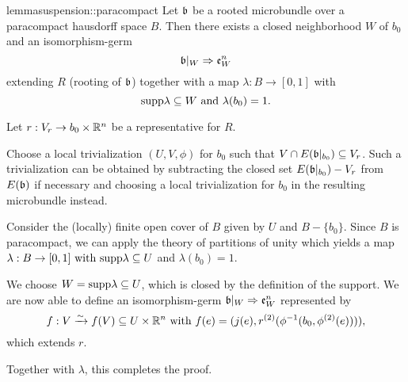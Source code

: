 \begin{mystatement}{lemma}{suspension::paracompact}
    Let $\bb$ be a rooted microbundle over a paracompact hausdorff space $B$.
    Then there exists a closed neighborhood $W$ of $b_0$ and an isomorphism-germ
    \[ \germ{\bb[W]}{\be{W}} \]
    extending $R$ (rooting of $\bb$) together with a map $\lambda: B \to [0, 1]$ with
    \[ \text{supp}{\lambda} \subseteq{} W \text{ and } \lambda(b_0) = 1. \]
\end{mystatement}

\begin{myproof}
    Let $r: V_r \to b_0 \times \mathbb{R}^n$ be a representative for $R$.
    
    Choose a local trivialization $(U, V, \phi)$ for $b_0$ such that $V \cap E(\bbb) \sub V_r$.
    Such a trivialization can be obtained by subtracting the closed set
    $E(\bbb) - V_r$ from $E(\bb)$ if necessary
    and choosing a local trivialization for $b_0$ in the resulting microbundle instead.
    
    Consider the (locally) finite open cover of $B$ given by $U$ and $B - \{b_0\}$.
    Since $B$ is paracompact, we can apply the theory
    of partitions of unity which yields a map
    $\lambda: B \to [0, 1] \text{ with } \text{supp}{\lambda} \subseteq{} U$ and $\lambda(b_0) = 1$.

    We choose $W = \text{supp}{\lambda} \subseteq{} U$,
    which is closed by the definition of the support.
    We are now able to define an isomorphism-germ $\germ{\bb[W]}{\be{W}}$ represented by
    \[ f: V \xrightarrow{\sim} f(V) \subseteq{} U \times \mathbb{R}^n \text{ with } f(e) = (j(e), r^{(2)}(\phi^{-1}(b_0, \phi^{(2)}(e)))), \]
    which extends $r$.

    Together with $\lambda$, this completes the proof.
\end{myproof}